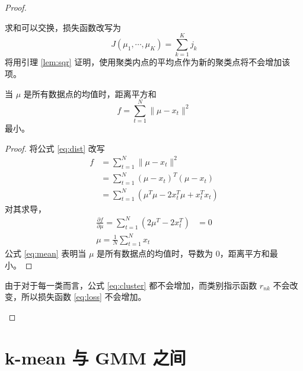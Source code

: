 \begin{proof}
\begin{enumerate}[(a)]
\begin{equation}
            \end{equation}
            求和可以交换，损失函数改写为
            \begin{equation}\label{eq:loss}
                J(\mu_1,\cdots,\mu_K)=\sum_{k=1}^K j_k
            \end{equation}
            将用引理 \ref{lem:sqr} 证明，使用聚类内点的平均点作为新的聚类点将不会增加该项。
            \begin{lemma}[距离平方和最小]\label{lem:sqr}
                当 $\mu$ 是所有数据点的均值时，距离平方和
                \begin{equation}\label{eq:dist}
                    f = \sum_{t=1}^N \| \mu-x_t \|^2
                \end{equation}
                最小。
                \begin{proof}
                    将公式 \eqref{eq:dist} 改写
                    \begin{align*}
                        f &= \sum_{t=1}^N \| \mu-x_t \|^2 \\
                          &= \sum_{t=1}^N (\mu-x_t)^T(\mu-x_t) \\
                          &= \sum_{t=1}^N \left(\mu^T\mu - 2x_t^T\mu+x_t^Tx_t\right)
                    \end{align*}
                    对其求导，
                    \begin{align}
                        \frac{\partial f}{\partial \mu} = \sum_{t=1}^N(2\mu^T-2x_t^T)&=0\nonumber\\
                        \mu=\frac{1}{N}\sum_{t=1}^N x_t\label{eq:mean}
                    \end{align}
                    公式 \eqref{eq:mean} 表明当 $\mu$ 是所有数据点的均值时，导数为 0，距离平方和最小。
                \end{proof}
            \end{lemma}
            由于对于每一类而言，公式 \eqref{eq:cluster} 都不会增加，而类别指示函数 $r_{nk}$ 不会改变，所以损失函数 \eqref{eq:loss} 不会增加。
        \end{enumerate}
    \end{proof}

    \section{k-mean 与 GMM 之间}

